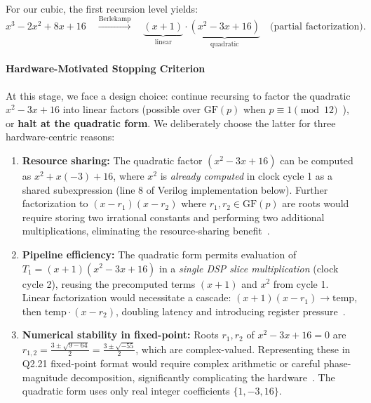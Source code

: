 For our cubic, the first recursion level yields:
\[
x^3 - 2x^2 + 8x + 16 \quad \xrightarrow{\text{Berlekamp}} \quad \underbrace{(x+1)}_{\text{linear}} \cdot \underbrace{(x^2 - 3x + 16)}_{\text{quadratic}} \quad \text{(partial factorization)}.
\]

\paragraph{Hardware-Motivated Stopping Criterion}

At this stage, we face a design choice: continue recursing to factor the quadratic $x^2 - 3x + 16$ into linear factors (possible over $\mathrm{GF}(p)$ when $p \equiv 1 \pmod{12}$~\cite{lidl1997finite}), or \textbf{halt at the quadratic form}. We deliberately choose the latter for three hardware-centric reasons:

\begin{enumerate}
\item \textbf{Resource sharing:} The quadratic factor $(x^2 - 3x + 16)$ can be computed as $x^2 + x(-3) + 16$, where $x^2$ is \emph{already computed} in clock cycle 1 as a shared subexpression (line 8 of Verilog implementation below). Further factorization to $(x - r_1)(x - r_2)$ where $r_1, r_2 \in \mathrm{GF}(p)$ are roots would require storing two irrational constants and performing two additional multiplications, eliminating the resource-sharing benefit~\cite{SinhaSrikanthan2014}.

\item \textbf{Pipeline efficiency:} The quadratic form permits evaluation of $T_1 = (x+1)(x^2 - 3x + 16)$ in a \emph{single DSP slice multiplication} (clock cycle 2), reusing the precomputed terms $(x+1)$ and $x^2$ from cycle 1. Linear factorization would necessitate a cascade: $(x+1)(x-r_1) \to \text{temp}$, then $\text{temp} \cdot (x-r_2)$, doubling latency and introducing register pressure~\cite{SinhaSrikanthan2014}.

\item \textbf{Numerical stability in fixed-point:} Roots $r_1, r_2$ of $x^2 - 3x + 16 = 0$ are $r_{1,2} = \frac{3 \pm \sqrt{9 - 64}}{2} = \frac{3 \pm \sqrt{-55}}{2}$, which are complex-valued. Representing these in Q2.21 fixed-point format would require complex arithmetic or careful phase-magnitude decomposition, significantly complicating the hardware~\cite{Muller2006}. The quadratic form uses only real integer coefficients $\{1, -3, 16\}$.
\end{enumerate}

